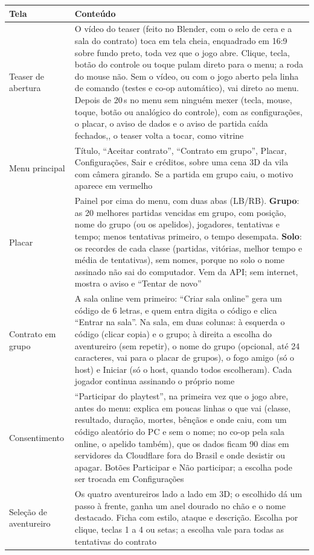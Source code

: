 \documentclass[11pt,a4paper]{article}
\begin{document}
\begin{xltabular}{\textwidth}{@{}lX@{}}
\toprule
\textbf{Tela} & \textbf{Conteúdo} \\
\midrule
Teaser de abertura & O vídeo do teaser (feito no Blender, com o selo de cera e a sala do contrato) toca em tela cheia, enquadrado em 16:9 sobre fundo preto, toda vez que o jogo abre. Clique, tecla, botão do controle ou toque pulam direto para o menu; a roda do mouse não. Sem o vídeo, ou com o jogo aberto pela linha de comando (testes e co-op automático), vai direto ao menu. Depois de 20\,s no menu sem ninguém mexer (tecla, mouse, toque, botão ou analógico do controle), com as configurações, o placar, o aviso de dados e o aviso de partida caída fechados,, o teaser volta a tocar, como vitrine \\
Menu principal & Título, ``Aceitar contrato'', ``Contrato em grupo'', Placar, Configurações, Sair e créditos, sobre uma cena 3D da vila com câmera girando. Se a partida em grupo caiu, o motivo aparece em vermelho \\
Placar & Painel por cima do menu, com duas abas (LB/RB). \textbf{Grupo}: as 20 melhores partidas vencidas em grupo, com posição, nome do grupo (ou os apelidos), jogadores, tentativas e tempo; menos tentativas primeiro, o tempo desempata. \textbf{Solo}: os recordes de cada classe (partidas, vitórias, melhor tempo e média de tentativas), sem nomes, porque no solo o nome assinado não sai do computador. Vem da API; sem internet, mostra o aviso e ``Tentar de novo'' \\
Contrato em grupo & A sala online vem primeiro: ``Criar sala online'' gera um código de 6 letras, e quem entra digita o código e clica ``Entrar na sala''. Na sala, em duas colunas: à esquerda o código (clicar copia) e o grupo; à direita a escolha do aventureiro (sem repetir), o nome do grupo (opcional, até 24 caracteres, vai para o placar de grupos), o fogo amigo (só o host) e Iniciar (só o host, quando todos escolheram). Cada jogador continua assinando o próprio nome \\
Consentimento & ``Participar do playtest'', na primeira vez que o jogo abre, antes do menu: explica em poucas linhas o que vai (classe, resultado, duração, mortes, bênçãos e onde caiu, com um código aleatório do PC e sem o nome; no co-op pela sala online, o apelido também), que os dados ficam 90 dias em servidores da Cloudflare fora do Brasil e onde desistir ou apagar. Botões Participar e Não participar; a escolha pode ser trocada em Configurações \\
Seleção de aventureiro & Os quatro aventureiros lado a lado em 3D; o escolhido dá um passo à frente, ganha um anel dourado no chão e o nome destacado. Ficha com estilo, ataque e descrição. Escolha por clique, teclas 1 a 4 ou setas; a escolha vale para todas as tentativas do contrato \\

\end{xltabular}
\end{document}
